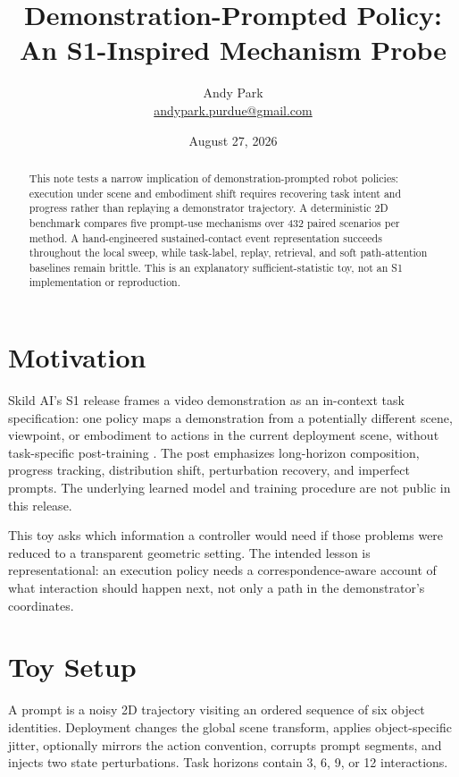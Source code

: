 \documentclass[11pt]{article}
\title{Demonstration-Prompted Policy:\\An S1-Inspired Mechanism Probe}
\author{Andy Park\\\href{mailto:andypark.purdue@gmail.com}{andypark.purdue@gmail.com}}
\date{August 27, 2026}
\begin{document}
\maketitle
\begin{abstract}
This note tests a narrow implication of demonstration-prompted robot policies: execution under scene and embodiment shift requires recovering task intent and progress rather than replaying a demonstrator trajectory. A deterministic 2D benchmark compares five prompt-use mechanisms over 432 paired scenarios per method. A hand-engineered sustained-contact event representation succeeds throughout the local sweep, while task-label, replay, retrieval, and soft path-attention baselines remain brittle. This is an explanatory sufficient-statistic toy, not an S1 implementation or reproduction.
\end{abstract}

\section{Motivation}
Skild AI's S1 release frames a video demonstration as an in-context task specification: one policy maps a demonstration from a potentially different scene, viewpoint, or embodiment to actions in the current deployment scene, without task-specific post-training \cite{s1}. The post emphasizes long-horizon composition, progress tracking, distribution shift, perturbation recovery, and imperfect prompts. The underlying learned model and training procedure are not public in this release.

This toy asks which information a controller would need if those problems were reduced to a transparent geometric setting. The intended lesson is representational: an execution policy needs a correspondence-aware account of what interaction should happen next, not only a path in the demonstrator's coordinates.

\section{Toy Setup}
A prompt is a noisy 2D trajectory visiting an ordered sequence of six object identities. Deployment changes the global scene transform, applies object-specific jitter, optionally mirrors the action convention, corrupts prompt segments, and injects two state perturbations. Task horizons contain 3, 6, 9, or 12 interactions.
\end{document}
